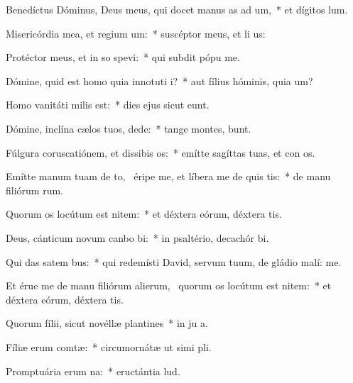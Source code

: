 \item Benedíctus Dóminus, Deus meus, qui docet manus as ad um,~* et dígitos   lum.
\item Misericórdia mea, et regium um:~* suscéptor meus, et li us:
\item Protéctor meus, et in so spevi:~* qui subdit pópu   me.
\item Dómine, quid est homo quia innotuti i?~* aut fílius hóminis, quia  um?
\item Homo vanitáti milis  est:~* dies ejus sicut  eunt.
\item Dómine, inclína cælos tuos,  dede:~* tange montes,  bunt.
\item Fúlgura coruscatiónem, et dissibis os:~* emítte sagíttas tuas, et con os.
\item Emítte manum tuam de to,~\pscross{} éripe me, et líbera me de quis tis:~* de manu filiórum rum.
\item Quorum os locútum est nitem:~* et déxtera eórum, déxtera tis.
\item Deus, cánticum novum canbo bi:~* in psaltério, decachór  bi.
\item Qui das satem bus:~* qui redemísti David, servum tuum, de gládio malí:  me.
\item Et érue me de manu filiórum alierum,~\pscross{} quorum os locútum est nitem:~* et déxtera eórum, déxtera tis.
\item Quorum fílii, sicut novéllæ plantines~* in ju a.
\item Fíliæ erum comtæ:~* circumornátæ ut simi pli.
\item Promptuária erum na:~* eructántia    lud.
